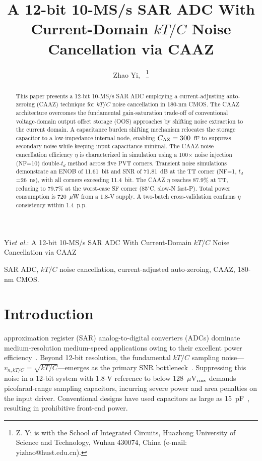 \documentclass[journal]{IEEEtran}
\begin{document}
\title{A 12-bit 10-MS/s SAR ADC With Current-Domain $kT/C$ Noise Cancellation via CAAZ}

\author{Zhao Yi,~
\thanks{Z. Yi is with the School of Integrated Circuits, Huazhong University of Science and Technology, Wuhan 430074, China (e-mail: yizhao@hust.edu.cn).}}

%
{Yi\MakeLowercase{\textit{et al.}}: A 12-bit 10-MS/s SAR ADC With Current-Domain $kT/C$ Noise Cancellation via CAAZ}

\maketitle

\begin{abstract}
This paper presents a 12-bit 10-MS/s SAR ADC employing a current-adjusting auto-zeroing (CAAZ) technique for $kT/C$ noise cancellation in 180-nm CMOS. The CAAZ architecture overcomes the fundamental gain-saturation trade-off of conventional voltage-domain output offset storage (OOS) approaches by shifting noise extraction to the current domain. A capacitance burden shifting mechanism relocates the storage capacitor to a low-impedance internal node, enabling $C_{\rm AZ}=300$~fF to suppress secondary noise while keeping input capacitance minimal. The CAAZ noise cancellation efficiency $\eta$ is characterized in simulation using a 100$\times$ noise injection (NF=10) double-$t_d$ method across five PVT corners. Transient noise simulations demonstrate an ENOB of 11.61~bit and SNR of 71.81~dB at the TT corner (NF=1, $t_d$=26~ns), with all corners exceeding 11.4~bit. The CAAZ $\eta$ reaches 87.9\% at TT, reducing to 79.7\% at the worst-case SF corner (85$^\circ$C, slow-N fast-P). Total power consumption is 720~$\mu$W from a 1.8-V supply. A two-batch cross-validation confirms $\eta$ consistency within 1.4~p.p.
\end{abstract}

\begin{IEEEkeywords}
SAR ADC, $kT/C$ noise cancellation, current-adjusted auto-zeroing, CAAZ, 180-nm CMOS.
\end{IEEEkeywords}

\section{Introduction}
 approximation register (SAR) analog-to-digital converters (ADCs) dominate medium-resolution medium-speed applications owing to their excellent power efficiency~\cite{liu12Bit10MS2016}. Beyond 12-bit resolution, the fundamental $kT/C$ sampling noise---$v_{n,kT/C}=\sqrt{kT/C}$---emerges as the primary SNR bottleneck~\cite{kapustaSamplingCircuitsThat2014}. Suppressing this noise in a 12-bit system with 1.8-V reference to below 128~$\mu$V$_{\rm rms}$ demands picofarad-range sampling capacitors, incurring severe power and area penalties on the input driver. Conventional designs have used capacitors as large as 15~pF~\cite{liu12Bit10MS2016}, resulting in prohibitive front-end power.
\end{document}
